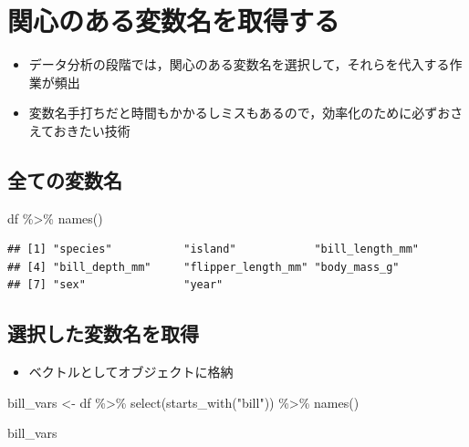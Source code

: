 \documentclass[
  xelatex,ja=standard, b5paper]{bxjsbook}
\newenvironment{Shaded}{\begin{snugshade}}{\end{snugshade}}
\newcommand{\FunctionTok}[1]{\textcolor[rgb]{0.00,0.00,0.00}{#1}}
\newcommand{\NormalTok}[1]{#1}
\newcommand{\OtherTok}[1]{\textcolor[rgb]{0.56,0.35,0.01}{#1}}
\newcommand{\SpecialCharTok}[1]{\textcolor[rgb]{0.00,0.00,0.00}{#1}}
\newcommand{\StringTok}[1]{\textcolor[rgb]{0.31,0.60,0.02}{#1}}
\providecommand{\tightlist}{%
  \setlength{\itemsep}{0pt}\setlength{\parskip}{0pt}}
\begin{document}
\hypertarget{select-get}{%
\section{関心のある変数名を取得する}\label{select-get}}

\begin{itemize}
\tightlist
\item
  データ分析の段階では，関心のある変数名を選択して，それらを代入する作業が頻出
\item
  変数名手打ちだと時間もかかるしミスもあるので，効率化のために必ずおさえておきたい技術
\end{itemize}

\hypertarget{select-get-name}{%
\subsection{全ての変数名}\label{select-get-name}}

\begin{Shaded}
\begin{Highlighting}[]
\NormalTok{df }\SpecialCharTok{\%\textgreater{}\%} \FunctionTok{names}\NormalTok{()}
\end{Highlighting}
\end{Shaded}

\begin{verbatim}
## [1] "species"           "island"            "bill_length_mm"   
## [4] "bill_depth_mm"     "flipper_length_mm" "body_mass_g"      
## [7] "sex"               "year"
\end{verbatim}

\hypertarget{select-get-obj}{%
\subsection{選択した変数名を取得}\label{select-get-obj}}

\begin{itemize}
\tightlist
\item
  ベクトルとしてオブジェクトに格納
\end{itemize}

\begin{Shaded}
\begin{Highlighting}[]
\NormalTok{bill\_vars }\OtherTok{\textless{}{-}} 
\NormalTok{  df }\SpecialCharTok{\%\textgreater{}\%} 
  \FunctionTok{select}\NormalTok{(}\FunctionTok{starts\_with}\NormalTok{(}\StringTok{"bill"}\NormalTok{)) }\SpecialCharTok{\%\textgreater{}\%} 
  \FunctionTok{names}\NormalTok{()}

\NormalTok{bill\_vars}
\end{Highlighting}
\end{Shaded}
\end{document}

